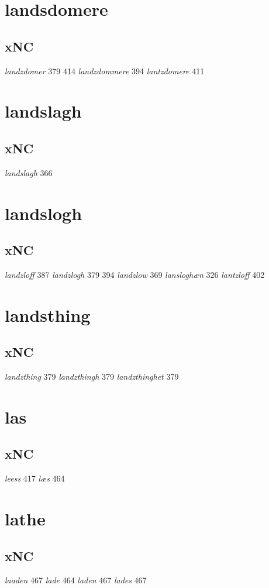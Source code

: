 \documentclass[a4paper,twocolumn]{article}
\begin{document}
\section{landsdomere}
\label{sec:orgfed5f1e}
\subsection{xNC}
\label{sec:org3ce1c91}
\emph{landzdomer} 379 414 \emph{landzdommere} 394 \emph{lantzdomere} 411 
\section{landslagh}
\label{sec:orgaa27f8e}
\subsection{xNC}
\label{sec:orgb638174}
\emph{landslagh} 366 
\section{landslogh}
\label{sec:orgf3db2be}
\subsection{xNC}
\label{sec:org4f3b4b6}
\emph{landzloff} 387 \emph{landzlogh} 379 394 \emph{landzlow} 369 \emph{lansloghæn} 326 \emph{lantzloff} 402 
\section{landsthing}
\label{sec:org6744f0c}
\subsection{xNC}
\label{sec:orgffe9cfa}
\emph{landzthing} 379 \emph{landzthingh} 379 \emph{landzthinghet} 379 
\section{las}
\label{sec:org2d8f01f}
\subsection{xNC}
\label{sec:orgda80280}
\emph{leess} 417 \emph{læs} 464 
\section{lathe}
\label{sec:org7d03f1f}
\subsection{xNC}
\label{sec:org142292b}
\emph{laaden} 467 \emph{lade} 464 \emph{laden} 467 \emph{lades} 467 
\end{document}
